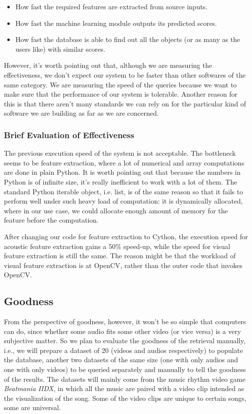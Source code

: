 \documentclass{report}
\begin{document}
\begin{itemize}
\item How fast the required features are extracted from source inputs.
\item How fast the machine learning module outputs its predicted scores.
\item How fast the database is able to find out all the objects (or as
  many as the users like) with similar scores.
\end{itemize}

However, it's worth pointing out that, although we are measuring the effectiveness, we don't expect our system to be faster than other softwares of the same category. We are measuring the speed of the queries because we want to make sure that the performance of our system is tolerable. Another reason for this is that there aren't many standards we can rely on for the particular kind of software we are building as far as we are concerned.

\subsubsection{Brief Evaluation of Effectiveness}
The previous execution speed of the system is not acceptable. The bottleneck seems to be feature extraction, where a lot of numerical and array computations are done in plain Python. It is worth pointing out that because the numbers in Python is of infinite size, it's really inefficient to work with a lot of them. The standard Python iterable object, i.e. list, is of the same reason so that it fails to perform well under such heavy load of computation: it is dynamically allocated, where in our use case, we could allocate enough amount of memory for the feature before the computation.

After changing our code for feature extraction to Cython, the execution speed for acoustic feature extraction gains a $50\%$ speed-up, while the speed for visual feature extraction is still the same. The reason might be that the workload of visual feature extraction is at OpenCV, rather than the outer code that invokes OpenCV.

\subsection{Goodness}

From the perspective of goodness, however, it won’t be so simple that computers can do, since whether some audio fits some other video (or vice versa) is a very subjective matter. So we plan to evaluate the goodness of the retrieval manually, i.e., we will prepare a dataset of 20 (videos and audios respectively) to populate the database, another two datasets of the same size (one with only audios and one with only videos) to be queried separately and manually to tell the goodness of the results. The datasets will mainly come from the music rhythm video game \textit{Beatmania IIDX}, in which all the music are paired with a video clip intended as the visualization of the song. Some of the video clips are unique to certain songs, some are universal.
\end{document}

